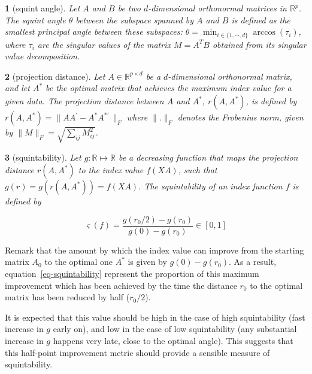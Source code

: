 \documentclass[
  12pt,
]{interact}
\theoremstyle{plain}
\newtheorem{defn}{\protect\definitionname}
\providecommand{\definitionname}{Definition}
\begin{document}
\begin{defn}[squint angle]\label{def:squint-angle}
Let $A$ and $B$ be two $d$-dimensional orthonormal matrices in $\mathbb{R}^p$. The squint angle $\theta$ between the subspace spanned by $A$ and $B$ is defined as the smallest principal angle between these subspaces: $\theta = \min_{i \in \{1, \cdots, d\}} \arccos(\tau_i)$, where $\tau_i$ are the singular values of the matrix $M = A^T B$ obtained from its singular value decomposition.
\end{defn}

\begin{defn}[projection distance]\label{def:proj-dist}
Let $A \in \mathbb{R}^{p \times d}$ be a $d$-dimensional orthonormal matrix, and let $A^*$ be the optimal matrix that achieves the maximum index value for a given data. The projection distance between $A$ 
and $A^*$, $r(A, A^*)$, is defined by
$r(A, A^*) = \lVert AA^\prime - A^*A^{*\prime}\,\rVert _F$
where $\lVert . \rVert _F$ denotes the Frobenius norm, given by
$\lVert M \rVert _F = \sqrt{\sum_{ij} M_{ij}^2}$. 
\end{defn}

\begin{defn}[squintability]\label{def:squintability}
Let $g: \mathbb{R} \mapsto  \mathbb{R}$ be a decreasing function that maps the projection distance $r(A, A^*)$ to the index value $f(XA)$, such that $g(r) = g(r(A, A^*)) = f(XA)$.  The squintability of an index function $f$ is defined by 

\begin{equation}
\varsigma(f) = \frac{g(r_{0}/2)-g(r_{0})}{g(0)-g(r_{0})} \in [0,1]
\label{eq-squintability}
\end{equation}

\end{defn}

Remark that the amount by which the index value can improve from the
starting matrix \(A_0\) to the optimal one \(A^*\) is given by
\(g(0)-g(r_{0})\). As a result, equation~\eqref{eq-squintability}
represent the proportion of this maximum improvement which has been
achieved by the time the distance \(r_0\) to the optimal matrix has been
reduced by half (\(r_0/2\)).

It is expected that this value should be high in the case of high
squintability (fast increase in \(g\) early on), and low in the case of
low squintability (any substantial increase in \(g\) happens very late,
close to the optimal angle). This suggests that this half-point
improvement metric should provide a sensible measure of squintability.
\end{document}
